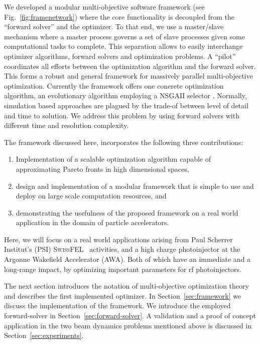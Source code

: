 \documentclass[%
reprint,
amsmath,amssymb,
aps,
]{revtex4-1}
\begin{document}
We developed a modular multi-objective software framework (see
  Fig.~\ref{fig:framenetwork}) where the core functionality is decoupled from
  the ``forward solver'' and the optimizer.
To that end, we use a master/slave mechanism where a master process governs a
  set of slave processes given some computational tasks to complete.
This separation allows to easily interchange optimizer algorithms, forward
  solvers and optimization problems.
A ``pilot'' coordinates all efforts between the optimization algorithm and the
  forward solver.
This forms a robust and general framework for massively parallel
  multi-objective optimization.
Currently the framework offers one concrete optimization algorithm, an
  evolutionary algorithm employing a \textsc{NSGAII} selector \cite{pisa}.
Normally, simulation based approaches are plagued by the trade-of between
  level of detail and time to solution.
We address this problem by using forward solvers with different time and
  resolution complexity.

The framework discussed here, incorporates the following three contributions:
%
\begin{enumerate}
  \item Implementation of a scalable optimization algorithm capable of
        approximating Pareto fronts in high dimensional spaces,
  \item design and implementation of a modular framework that is simple to use
        and deploy on large scale computation resources, and
  \item demonstrating the usefulness of the proposed framework on a real world
        application in the domain of particle accelerators.
\end{enumerate}

Here, we will focus on a real world applications arising from Paul Scherrer Institut's (PSI)
  \textsc{SwissFEL}~\cite{pedr:10} activities, and a high charge photoinjector 
  at the Argonne Wakefield Accelerator (AWA). Both of which have an immediate and a
  long-range impact, by optimizing important parameters for rf photoinjectors. 

The next section introduces the notation of multi-objective optimization
  theory and describes the first implemented optimizer.
In Section~\ref{sec:framework} we discuss the implementation of the framework.
We introduce the employed forward-solver in Section~\ref{sec:forward-solver}.
A validation and a proof of concept application in the two beam dynamics problems 
mentioned above is discussed in Section~\ref{sec:experiments}.
\end{document}

